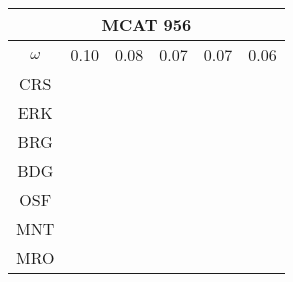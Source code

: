 \documentclass[a4paper,12pt]{article}
\begin{document}
\begin{tabular}{|c|c|c|c|c|c|}%
         \hline \multicolumn{6}{|c|}{MCAT 956} \\ \hline
         $\omega$&0.10&0.08&0.07&0.07&0.06\\ \hline %
        CRS&\cellcolor[HTML]{E41A1C}&\cellcolor[HTML]{E41A1C}&\cellcolor[HTML]{E41A1C}&\cellcolor[HTML]{E41A1C}&\cellcolor[HTML]{E41A1C}\\ \hline %
        ERK&\cellcolor[HTML]{377EB8}&\cellcolor[HTML]{E41A1C}&\cellcolor[HTML]{E41A1C}&\cellcolor[HTML]{E41A1C}&\cellcolor[HTML]{E41A1C}\\ \hline %
        BRG&\cellcolor[HTML]{4DAF4A}&\cellcolor[HTML]{377EB8}&\cellcolor[HTML]{377EB8}&\cellcolor[HTML]{377EB8}&\cellcolor[HTML]{377EB8}\\ \hline %
        BDG&\cellcolor[HTML]{4DAF4A}&\cellcolor[HTML]{377EB8}&\cellcolor[HTML]{377EB8}&\cellcolor[HTML]{377EB8}&\cellcolor[HTML]{377EB8}\\ \hline %
        OSF&\cellcolor[HTML]{4DAF4A}&\cellcolor[HTML]{377EB8}&\cellcolor[HTML]{4DAF4A}&\cellcolor[HTML]{377EB8}&\cellcolor[HTML]{4DAF4A}\\ \hline %
        MNT&\cellcolor[HTML]{984EA3}&\cellcolor[HTML]{4DAF4A}&\cellcolor[HTML]{4DAF4A}&\cellcolor[HTML]{4DAF4A}&\cellcolor[HTML]{4DAF4A}\\ \hline %
        MRO&\cellcolor[HTML]{984EA3}&\cellcolor[HTML]{4DAF4A}&\cellcolor[HTML]{4DAF4A}&\cellcolor[HTML]{4DAF4A}&\cellcolor[HTML]{4DAF4A}\\ \hline %

\end{tabular}
\end{document}
